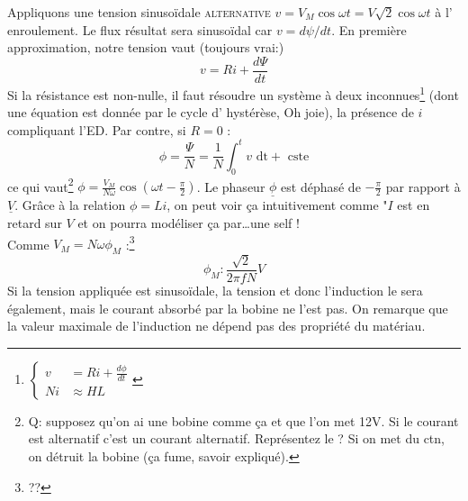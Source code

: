 		Appliquons une tension sinusoïdale \textsc{alternative} $v = V_M\cos\omega t = V
		\sqrt{2}\cos\omega t$ à l'	enroulement. Le flux résultat sera 
		sinusoïdal car $v = d\psi/dt$.	En première approximation, notre 
		tension vaut (toujours vrai:)
		\begin{equation}
		v = Ri + \frac{d\Psi}{dt}
		\end{equation}
		Si la résistance est non-nulle, il faut résoudre un système à 
		deux inconnues\footnote{$\left\{\begin{array}{ll}
		v &= Ri + \frac{d\phi}{dt}\\
		Ni &\approx HL
		\end{array}\right.$} (dont une équation est donnée par le cycle d'
		hystérèse, Oh joie), la présence de $i$ compliquant l'ED. Par 
		contre, si $R=0$ :
		\begin{equation}
		\phi = \frac{\Psi}{N} = \frac{1}{N}\int_0^tv\text{ dt} + \text{ 
		cste}
		\end{equation}
		ce qui vaut\footnote{Q: supposez qu'on ai une bobine comme ça et 
		que l'on met 12V. Si le courant est alternatif c'est un courant 
		alternatif. Représentez le ? Si on met du ctn, on détruit la bobine 
		(ça fume, savoir expliqué).} $\phi = \frac{V_M}{N\omega}\cos\left(
		\omega t - \frac{\pi}{2}\right)$. Le phaseur $\underline{\phi}$ est 
		déphasé de $-\frac{\pi}{2}$ par rapport à $\underline{V}$. Grâce à la 
		relation $\phi = Li$, on peut voir ça intuitivement comme "$I$ est 
		en retard sur $V$ et on pourra modéliser ça par\dots une self !\\
		Comme $V_M = N\omega\phi_M$ :\footnote{??}
		\begin{equation}
		\phi_M : \dfrac{\sqrt{2}}{2\pi f N}V
		\end{equation}
		Si la tension appliquée est sinusoïdale, la tension et donc 
		l'induction le sera également, mais le courant absorbé par la 
		bobine ne l'est pas. On remarque que la valeur maximale de l'induction 
		ne dépend pas des propriété du matériau.
			
